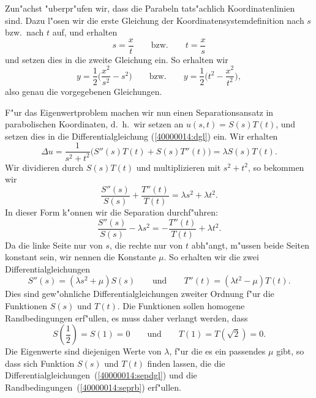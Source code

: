\begin{loesung}
Zun"achst "uberpr"ufen wir, dass die Parabeln tats"achlich Koordinatenlinien
sind.
Dazu l"osen wir die erste Gleichung der Koordinatensystemdefinition nach $s$
bzw.~nach $t$ auf, und erhalten
\[
s=\frac{x}{t}
\qquad\text{bzw.}\qquad
t=\frac{x}{s}
\]
und setzen dies in die zweite Gleichung ein. 
So erhalten wir
\[
y=\frac12\biggl(\frac{x^2}{s^2}-s^2\biggr)
\qquad\text{bzw.}\qquad
y=\frac12\biggl(t^2 - \frac{x^2}{t^2}\biggr),
\]
also genau die vorgegebenen Gleichungen.

F"ur das Eigenwertproblem machen wir nun einen Separationsansatz in 
parabolischen Koordinaten, d.~h.~wir setzen an $u(s,t)=S(s)T(t)$, und
setzen dies in die Differentialgleichung (\ref{40000014:dgl}) ein.
Wir erhalten
\[
\Delta u
=
\frac1{s^2+t^2}\bigl(S''(s)T(t) + S(s)T''(t)\bigr) = \lambda S(s)T(t).
\]
Wir dividieren durch $S(s)T(t)$ und multiplizieren mit $s^2+t^2$, so
bekommen wir
\[
\frac{S''(s)}{S(s)} + \frac{T''(t)}{T(t)}=\lambda s^2 + \lambda t^2.
\]
In dieser Form k"onnen wir die Separation durchf"uhren:
\[
\frac{S''(s)}{S(s)} - \lambda s^2 = - \frac{T''(t)}{T(t)} + \lambda t^2.
\]
Da die linke Seite nur von $s$, die rechte nur von $t$ abh"angt, m"ussen
beide Seiten konstant sein, wir nennen die Konstante $\mu$.
So erhalten wir die zwei Differentialgleichungen
\begin{equation}
S''(s)=(\lambda s^2+\mu)S(s)
\qquad\text{und}\qquad
T''(t) = (\lambda t^2-\mu)T(t).
\label{40000014:sepdgl}
\end{equation}
Dies sind gew"ohnliche Differentialgleichungen zweiter Ordnung f"ur die
Funktionen $S(s)$ und $T(t)$.
Die Funktionen sollen homogene Randbedingungen erf"ullen, es muss daher
verlangt werden, dass
\begin{equation}
S({\textstyle \frac12})=S(1)=0
\qquad\text{und}\qquad
T(1)=T(\sqrt{2})=0.
\label{40000014:seprb}
\end{equation}
Die Eigenwerte sind diejenigen Werte von $\lambda$, f"ur die es ein passendes
$\mu$ gibt, so dass sich Funktion $S(s)$ und $T(t)$ finden lassen, die
die Differentialgleichungen~(\ref{40000014:sepdgl}) und die
Randbedingungen~(\ref{40000014:seprb}) erf"ullen.
\end{loesung}

